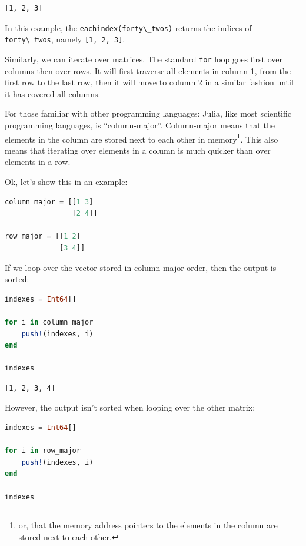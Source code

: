 \documentclass[
  notoc %
]{tufte-book}
\newcommand{\passthrough}[1]{#1}
\begin{document}
\begin{lstlisting}[language=Output]
[1, 2, 3]
\end{lstlisting}

In this example, the \passthrough{\lstinline!eachindex(forty\_twos)!}
returns the indices of \passthrough{\lstinline!forty\_twos!}, namely
\passthrough{\lstinline![1, 2, 3]!}.

Similarly, we can iterate over matrices. The standard
\passthrough{\lstinline!for!} loop goes first over columns then over
rows. It will first traverse all elements in column 1, from the first
row to the last row, then it will move to column 2 in a similar fashion
until it has covered all columns.

For those familiar with other programming languages: Julia, like most
scientific programming languages, is ``column-major''. Column-major
means that the elements in the column are stored next to each other in
memory\footnote{or, that the memory address pointers to the elements in
  the column are stored next to each other.}. This also means that
iterating over elements in a column is much quicker than over elements
in a row.

Ok, let's show this in an example:

\begin{lstlisting}[language=Julia]
column_major = [[1 3]
                [2 4]]

row_major = [[1 2]
             [3 4]]
\end{lstlisting}

If we loop over the vector stored in column-major order, then the output
is sorted:

\begin{lstlisting}[language=Julia]
indexes = Int64[]

for i in column_major
    push!(indexes, i)
end

indexes
\end{lstlisting}

\begin{lstlisting}[language=Output]
[1, 2, 3, 4]
\end{lstlisting}

However, the output isn't sorted when looping over the other matrix:

\begin{lstlisting}[language=Julia]
indexes = Int64[]

for i in row_major
    push!(indexes, i)
end

indexes
\end{lstlisting}
\end{document}
